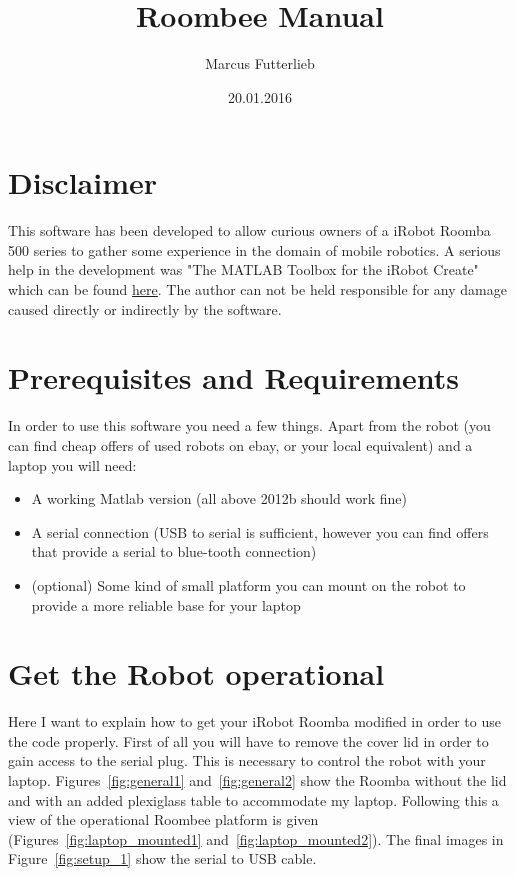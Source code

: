 \documentclass[oneside,12pt,fancychapters]{scrbook} %
\title{Roombee Manual}
\author{Marcus Futterlieb}
\date{20.01.2016}
\begin{document}
\dominitoc
\maketitle

\tableofcontents

\chapter{Disclaimer}
This software has been developed to allow curious owners of a iRobot Roomba 500 series to gather some experience in the domain of mobile robotics. 
A serious help in the development was "The MATLAB Toolbox for the iRobot Create" which can be found \href{http://www.usna.edu/Users/weapsys/esposito/roomba-matlab.php}{here}.
The author can not be held responsible for any damage caused directly or indirectly by the software. 


\chapter{Prerequisites and Requirements}
In order to use this software you need a few things.
Apart from the robot (you can find cheap offers of used robots on ebay, or your local equivalent) and a laptop you will need:
\begin{itemize}
  \item A working Matlab version (all above 2012b should work fine)
  \item A serial connection (USB to serial is sufficient, however you can find offers that provide a serial to blue-tooth connection)
  \item (optional) Some kind of small platform you can mount on the robot to provide a more reliable base for your laptop
\end{itemize}

\chapter{Get the Robot operational}
Here I want to explain how to get your iRobot Roomba modified in order to use the code properly.
First of all you will have to remove the cover lid in order to gain access to the serial plug.
This is necessary to control the robot with your laptop.
Figures~\ref{fig:general1} and~\ref{fig:general2} show the Roomba without the lid and with an added plexiglass table to accommodate my laptop. 
Following this a view of the operational Roombee platform is given (Figures~\ref{fig:laptop_mounted1} and~\ref{fig:laptop_mounted2}).
The final images in Figure~\ref{fig:setup_1} show the serial to USB cable.
\end{document}
